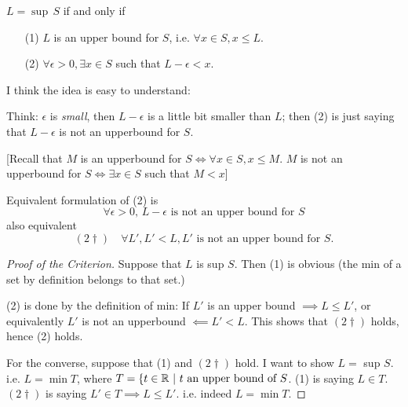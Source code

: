 \documentclass[10pt]{scrartcl}
\begin{document}
$L = \sup\,S$ if and only if
\begin{enumerate}
\item[(1)] $L$ is an upper bound for $S$, i.e. $\forall x \in S, x \leq L$.
\item[(2)] $\forall \epsilon >0, \exists x \in S$ such that $L-\epsilon <x$.
\end{enumerate}\vspace*{5pt}

I think the idea is easy to understand: 

\begin{center}
\end{center}

Think: $\epsilon$ is \emph{small}, then $L-\epsilon$ is a little bit smaller than $L$; then (2) is just saying that $L-\epsilon$ is not an upperbound for $S$. 

[Recall that $M$ is an upperbound for $S \iff \forall x \in S, x \leq M$. $M$ is not an upperbound for $S \iff \exists x \in S$ such that $M < x$]

Equivalent formulation of (2) is 
\[\forall \epsilon > 0,\, L-\epsilon \text{ is not an upper bound for } S\]
also equivalent
\[(2\dagger) \quad \forall L', L'<L, L' \text{ is not an upper bound for } S.\]

\begin{proof}[Proof of the Criterion]
	Suppose that $L$ is sup $S$. Then (1) is obvious (the min of a set by definition belongs to that set.)
	
(2) is done by the definition of min: If $L'$ is an upper bound $\implies L \leq L'$, or equivalently $L'$ is not an upperbound $\impliedby L' <L$. This shows that $(2\dagger)$ holds, hence (2) holds. 
	
	For the converse, suppose that (1) and $(2\dagger)$ hold. I want to show $L =$ sup $S$. i.e. $L = \min T$, where $T = \{t \in\mathbb{R} ~|~ t \text{ an upper bound of } S$. (1) is saying $L \in T$. $(2\dagger)$ is saying $L' \in T \implies L \leq L'$. i.e. indeed $L = \min T$.
\end{proof}
\end{document}
